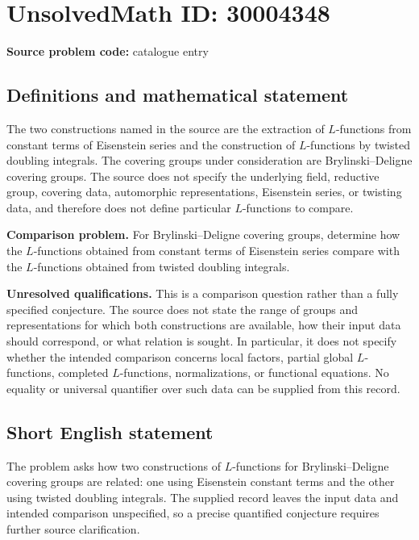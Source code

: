 \documentclass[11pt]{article}
\begin{document}
\section*{UnsolvedMath ID: 30004348}
\textbf{Source problem code:} catalogue entry
\subsection{Definitions and mathematical statement}
The two constructions named in the source are the extraction of \(L\)-functions from constant terms of Eisenstein series and the construction of \(L\)-functions by twisted doubling integrals. The covering groups under consideration are Brylinski--Deligne covering groups. The source does not specify the underlying field, reductive group, covering data, automorphic representations, Eisenstein series, or twisting data, and therefore does not define particular \(L\)-functions to compare.

\textbf{Comparison problem.} For Brylinski--Deligne covering groups, determine how the \(L\)-functions obtained from constant terms of Eisenstein series compare with the \(L\)-functions obtained from twisted doubling integrals.

\textbf{Unresolved qualifications.} This is a comparison question rather than a fully specified conjecture. The source does not state the range of groups and representations for which both constructions are available, how their input data should correspond, or what relation is sought. In particular, it does not specify whether the intended comparison concerns local factors, partial global \(L\)-functions, completed \(L\)-functions, normalizations, or functional equations. No equality or universal quantifier over such data can be supplied from this record.
\subsection{Short English statement}
The problem asks how two constructions of \(L\)-functions for Brylinski--Deligne covering groups are related: one using Eisenstein constant terms and the other using twisted doubling integrals. The supplied record leaves the input data and intended comparison unspecified, so a precise quantified conjecture requires further source clarification.
\end{document}
